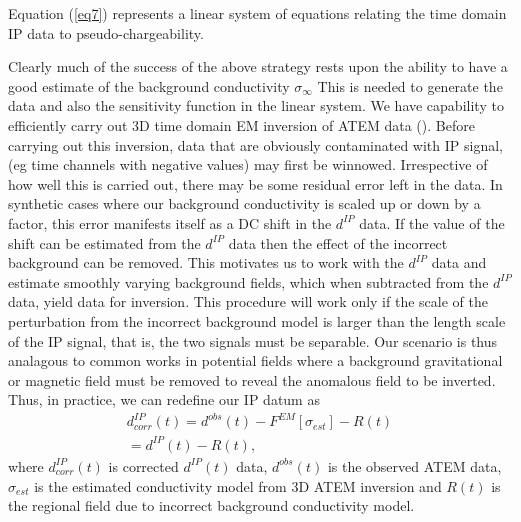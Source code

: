 \documentclass{segabs}
\begin{document}
Equation (\ref{eq7}) represents a linear system of equations relating the time domain IP data to pseudo-chargeability.

Clearly much of the success of the above strategy rests upon the ability to have a good estimate of the background conductivity $\sigma_{\infty}$ This is needed to generate the data and also the sensitivity function in the linear system. We have capability to efficiently carry out 3D time domain EM inversion of ATEM data (\cite{yang20143}). Before carrying out this inversion, data that are obviously contaminated with IP signal, (eg time channels with negative values) may first be winnowed. Irrespective of how well this is carried out, there may be some residual error left in the data. In synthetic cases where our background conductivity is scaled up or down by a factor, this error manifests itself as a DC shift in the $d^{IP}$ data. If the value of the shift can be estimated from the $d^{IP}$ data then the effect of the incorrect background can be removed. This motivates us to work with the $d^{IP}$ data and estimate smoothly varying background fields, which when subtracted from the $d^{IP}$ data, yield data for inversion. This procedure will work only if the scale of the perturbation from the incorrect background model is larger than the length scale of the IP signal, that is, the two signals must be separable. Our scenario is thus analagous to common works in potential fields where a background gravitational or magnetic field must be removed to reveal the anomalous field to be inverted.  Thus, in practice, we can redefine our IP datum as
\begin{eqnarray}
  d^{IP}_{corr}(t)  = d^{obs}(t) - F^{EM}[\sigma_{est}] - R(t) \nonumber \\
  = d^{IP}(t) - R(t),
  \label{eq8}
\end{eqnarray}
where $d^{IP}_{corr}(t)$ is corrected $d^{IP}(t)$ data, $d^{obs}(t)$ is the observed ATEM data, $\sigma_{est}$ is the estimated conductivity model from 3D ATEM inversion and $R(t)$ is the regional field due to incorrect background conductivity model.


\end{document}
